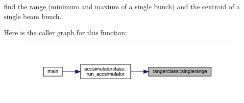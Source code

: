 find the range (minimum and maxium of a single bunch) and the centroid of a single beam bunch. 

Here is the caller graph for this function\+:\nopagebreak
\begin{figure}[H]
\begin{center}
\leavevmode
\includegraphics[width=350pt]{namespacerangerclass_a5e8eb23d6d5bf16cd2d36cd10ecf6f70_icgraph}
\end{center}
\end{figure}
